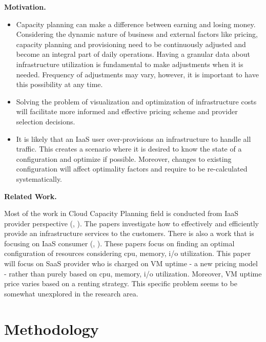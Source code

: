 \documentclass[11pt]{artikel3}
\begin{document}
{\bf Motivation.}
\begin{itemize}
\item Capacity planning can make a difference between earning and losing money. Considering the dynamic nature of business and external factors like pricing, capacity planning and provisioning need to be continuously adjusted and become an integral part of daily operations. Having a granular data about infrastructure utilization is fundamental to make adjustments when it is needed. Frequency of adjustments may vary, however, it is important to have this possibility at any time.
\item Solving the problem of visualization and optimization of infrastructure costs will facilitate more informed and effective pricing scheme and provider selection decisions.
\item It is likely that an IaaS user over-provisions an infrastructure to handle all traffic. This creates a scenario where it is desired to know the state of a configuration and optimize if possible. Moreover, changes to existing configuration will affect optimality factors and require to be re-calculated systematically.  

\end{itemize}

{\bf Related Work.}

Most of the work in Cloud Capacity Planning field is conducted from IaaS provider perspective (\cite{bib:join_pricing}, \cite{bib:self_adaptive}). The papers investigate how to effectively and efficiently provide an infrastructure services to the customers.
There is also a work that is focusing on IaaS consumer (\cite{bib:cost-aware-elasticity}, \cite{bib:elastic-capacity-planning}). These papers focus on finding an optimal configuration of resources considering cpu, memory, i/o utilization.
This paper will focus on SaaS provider who is charged on VM uptime - a new pricing model - rather than purely based on cpu, memory, i/o utilization. Moreover, VM uptime price varies based on a renting strategy. This specific problem seems to be somewhat unexplored in the research area.

\section{Methodology}
\end{document}
